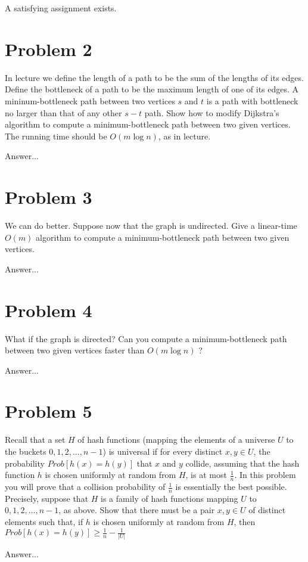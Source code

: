\documentclass[10pt]{article}
\begin{document}
A satisfying assignment exists.

\section*{\normalsize Problem 2}

In lecture we define the length of a path to be the sum of the lengths of its edges. Define the bottleneck of a path to be the maximum length of one of its edges. A mininum-bottleneck path between two vertices $s$ and $t$ is a path with bottleneck no larger than that of any other $s-t$ path. Show how to modify Dijkstra's algorithm to compute a minimum-bottleneck path between two given vertices. The running time should be $O(m \log ⁡n)$, as in lecture.
\bigskip

Answer...

\section*{\normalsize Problem 3}

We can do better. Suppose now that the graph is undirected. Give a linear-time $O(m)$ algorithm to compute a minimum-bottleneck path between two given vertices.
\bigskip

Answer...

\section*{\normalsize Problem 4}

What if the graph is directed? Can you compute a minimum-bottleneck path between two given vertices faster than $O(m \log n)$ ?
\bigskip

Answer...

\section*{\normalsize Problem 5}

Recall that a set $H$ of hash functions (mapping the elements of a universe $U$ to the buckets ${0,1,2,\dots,n-1}$) is universal if for every distinct $x,y \in U$, the probability $Prob[h(x) = h(y)]$ that $x$ and $y$ collide, assuming that the hash function $h$ is chosen uniformly at random from $H$, is at most $\frac{1}{n}$. In this problem you will prove that a collision probability of $\frac{1}{n}$ is essentially the best possible. Precisely, suppose that $H$ is a family of hash functions mapping $U$ to ${0,1,2,\dots,n-1}$, as above. Show that there must be a pair $x,y \in U$ of distinct elements such that, if $h$ is chosen uniformly at random from $H$, then $Prob[h(x) = h(y)] \geq \frac{1}{n} - \frac{1}{|U|}$
\bigskip

Answer...
\end{document}
